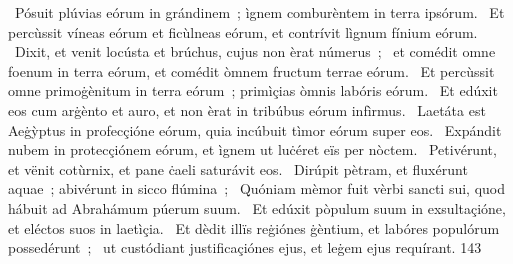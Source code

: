 {~Pósuit plúvias eórum in grándinem~; ìgnem comburèntem in terra ipsórum.
~Et percùssit víneas eórum et ficùlneas eórum, et contrívit lìgnum fínium eórum.
~Dixit, et venit locústa et brúchus, cujus non èrat númerus~;
~et comédit omne foenum in terra eórum, et comédit òmnem fructum terrae eórum.
~Et percùssit omne primoġènitum in terra eórum~; primìçias òmnis labóris eórum.
~Et edúxit eos cum arġènto et auro, et non èrat in tribúbus eórum infìrmus.
~Laetáta est Aeġỳptus in profecçióne eórum, quia incúbuit tìmor eórum super eos.
~Expándit nubem in protecçiónem eórum, et ìgnem ut luċéret eïs per nòctem.
~Petivérunt, et vënit cotùrnix, et pane ċaeli saturávit eos.
~Dirúpit pètram, et fluxérunt aquae~; abivérunt in sicco flúmina~;
~Quóniam mèmor fuit vèrbi sancti sui, quod hábuit ad Abrahámum púerum suum.
~Et edúxit pòpulum suum in exsultaçióne, et eléctos suos in laetìçia.
~Et dèdit illïs reġiónes ġèntium, et labóres populórum possedérunt~;
~ut custódiant justificaçiónes ejus, et leġem ejus requírant.}
{14}{3}
